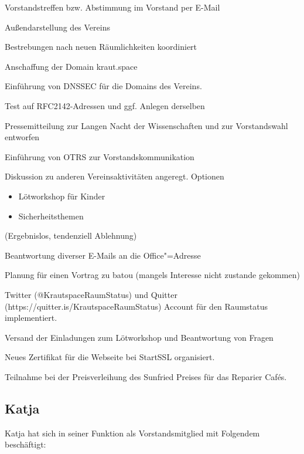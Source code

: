 \documentclass[ngerman]{scrartcl}
\begin{document}
\begin{compactitem}
\item Vorstandstreffen bzw. Abstimmung im Vorstand per E-Mail
\item Außendarstellung des Vereins
\item Bestrebungen nach neuen Räumlichkeiten koordiniert 
\item Anschaffung der Domain kraut.space
\item Einführung von DNSSEC für die Domains des Vereins.
\item Test auf RFC2142-Adressen und ggf. Anlegen derselben
\item Pressemitteilung zur Langen Nacht der Wissenschaften und zur
  Vorstandswahl entworfen
\item Einführung von OTRS zur Vorstandskommunikation
\item Diskussion zu anderen Vereinsaktivitäten angeregt. Optionen
  \begin{itemize}
  \item Lötworkshop für Kinder
  \item Sicherheitsthemen
  \end{itemize} (Ergebnislos, tendenziell Ablehnung)
\item Beantwortung diverser E-Mails an die Office"=Adresse
\item Planung für einen Vortrag zu batou (mangels Interesse nicht
  zustande gekommen)
\item Twitter (@KrautspaceRaumStatus) und Quitter
  (https://quitter.is/KrautspaceRaumStatus) Account für den Raumstatus
  implementiert.
\item Versand der Einladungen zum Lötworkshop und Beantwortung von
  Fragen
\item Neues Zertifikat für die Webseite bei StartSSL organisiert.
\item Teilnahme bei der Preisverleihung des Sunfried Preises für das Reparier Cafés.
\end{compactitem}

\subsection{Katja}

Katja hat sich in seiner Funktion als Vorstandsmitglied mit Folgendem 
beschäftigt:
\end{document}
